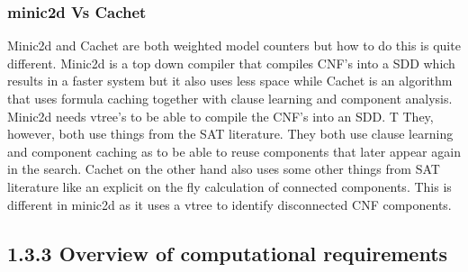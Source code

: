 \documentclass[a4paper,10pt]{report}
\begin{document}
\subsubsection*{minic2d Vs Cachet}
Minic2d and Cachet are both weighted model counters but how to do this is quite different.
Minic2d is a top down compiler that compiles CNF's into a SDD which results in a faster system but it also uses less space while Cachet is an algorithm that uses formula caching together with clause learning and component analysis. Minic2d needs vtree's to be able to compile the CNF's into an SDD. 
T%
They, however, both use things from the SAT literature. 
They both use clause learning and component caching as to be able to reuse components that later appear again in the search. Cachet on the other hand also uses some other things from SAT literature like an explicit on the fly calculation of connected components. This is different in minic2d as it uses a vtree to identify disconnected CNF components. 

\cite{minic2d} \cite{Cachet}



\subsection*{1.3.3 Overview of computational requirements}
\end{document}
